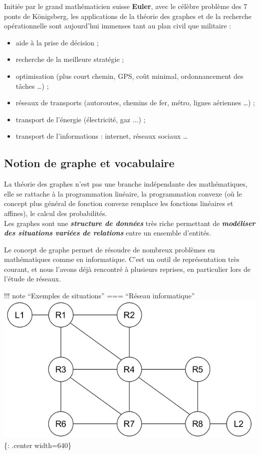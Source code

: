 \documentclass[
  letterpaper,
  DIV=11,
  numbers=noendperiod]{scrartcl}
\providecommand{\tightlist}{%
  \setlength{\itemsep}{0pt}\setlength{\parskip}{0pt}}\usepackage{longtable,booktabs,array}
\begin{document}
Initiée par le grand mathématicien suisse \textbf{Euler}, avec le
célèbre problème des 7 ponts de Königsberg, les applications de la
théorie des graphes et de la recherche opérationnelle sont aujourd'hui
immenses tant au plan civil que militaire :

\begin{itemize}
\tightlist
\item
  aide à la prise de décision ;\\
\item
  recherche de la meilleure stratégie ;
\item
  optimisation (plus court chemin, GPS, coût minimal, ordonnancement des
  tâches \ldots) ;\\
\item
  réseaux de transports (autoroutes, chemins de fer, métro, lignes
  aériennes \ldots) ;\\
\item
  transport de l'énergie (électricité, gaz ...) ;\\
\item
  transport de l'informations : internet, réseaux sociaux \ldots{}
\end{itemize}

\hypertarget{notion-de-graphe-et-vocabulaire}{%
\subsection{Notion de graphe et
vocabulaire}\label{notion-de-graphe-et-vocabulaire}}

La théorie des graphes n'est pas une branche indépendante des
mathématiques, elle se rattache à la programmation linéaire, la
programmation convexe (où le concept plus général de fonction convexe
remplace les fonctions linéaires et affines), le calcul des
probabilités.\\
Les graphes sont une \textbf{\emph{structure de données}} très riche
permettant de \textbf{\emph{modéliser des situations variées de
relations}} entre un ensemble d'entités.

Le concept de graphe permet de résoudre de nombreux problèmes en
mathématiques comme en informatique. C'est un outil de représentation
très courant, et nous l'avons déjà rencontré à plusieurs reprises, en
particulier lors de l'étude de réseaux.

!!! note ``Exemples de situations'' === ``Réseau informatique''
\includegraphics{data/22J2AS1_ex2.png}\{: .center width=640\}
\end{document}
